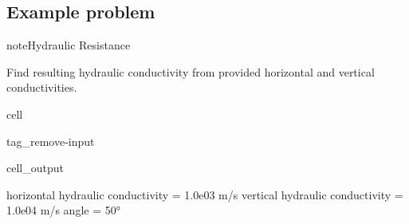 \documentclass[letterpaper,10pt,english]{jupyterBook}
\begin{document}
\subsection{Example problem}
\label{\detokenize{content/flow/L5/15_het_iso:id3}}
\begin{sphinxadmonition}{note}{Hydraulic Resistance}

\sphinxAtStartPar
Find resulting hydraulic conductivity from provided horizontal and vertical conductivities.
\end{sphinxadmonition}

\begin{sphinxuseclass}{cell}
\begin{sphinxuseclass}{tag_remove-input}\begin{sphinxVerbatimOutput}

\begin{sphinxuseclass}{cell_output}
\begin{sphinxVerbatim}[commandchars=\\\{\}]

horizontal hydraulic conductivity = 1.0e\PYGZhy{}03 m/s
vertical hydraulic conductivity = 1.0e\PYGZhy{}04 m/s
angle = 50°
\end{sphinxVerbatim}

\end{sphinxuseclass}\end{sphinxVerbatimOutput}

\end{sphinxuseclass}
\end{sphinxuseclass}
\end{document}
